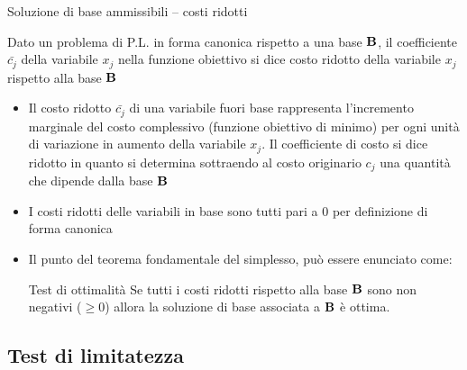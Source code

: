 \documentclass{beamer}
\begin{document}
\begin{frame}[allowframebreaks]{Soluzione di base ammissibili -- costi ridotti}

\begin{definition}
Dato un problema di P.L. in forma canonica rispetto a una base $\mathbf{B}$, il coefficiente $\bar{c_j}$ della variabile $x_j$ nella funzione obiettivo si dice costo ridotto della variabile $x_j$ rispetto alla base $\mathbf{B}$
\end{definition}

\begin{itemize}
\item   Il costo ridotto $\bar{c_j}$ di una variabile fuori base rappresenta l'incremento marginale del costo complessivo (funzione obiettivo di minimo) per ogni unit\`a di variazione in aumento della variabile $x_j$. Il coefficiente di costo si dice ridotto in quanto si determina sottraendo al costo originario $c_j$ una quantit\`a che dipende dalla base $\mathbf{B}$

\item   I costi ridotti delle variabili in base sono tutti pari a 0 per definizione di forma canonica

\item Il punto  del teorema fondamentale del simplesso, pu\`o essere enunciato come:
   
\begin{block}{Test di ottimalit\`a}
Se tutti i costi ridotti rispetto alla base $\mathbf{B}$ sono non negativi ($\geq 0$) allora la soluzione di base
   associata a $\mathbf{B}$ \`e ottima.
\end{block}

\end{itemize}
\end{frame}

\subsection{Test di limitatezza}
\end{document}
